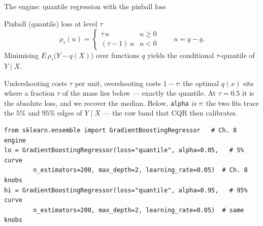 \documentclass[aspectratio=169,11pt]{beamer}
\begin{document}
\begin{frame}[fragile]{The engine: quantile regression with the pinball loss}
  \footnotesize
  \begin{block}{Pinball (quantile) loss at level $\tau$}
    \[
      \rho_\tau(u) =
      \begin{cases}
        \tau\, u & u \ge 0 \\
        (\tau - 1)\, u & u < 0
      \end{cases}
      \qquad u = y - q .
    \]
    Minimising $E\,\rho_\tau\big(Y - q(X)\big)$ over functions $q$ yields the
    conditional $\tau$-quantile of $Y \mid X$.
  \end{block}
  \begin{readme}
    Undershooting costs $\tau$ per unit, overshooting costs $1 - \tau$: the optimal
    $q(x)$ sits where a fraction $\tau$ of the mass lies below --- exactly the
    quantile. At $\tau = 0.5$ it is the absolute loss, and we recover the median.
    Below, \texttt{alpha} \emph{is} $\tau$: the two fits trace the $5\%$ and
    $95\%$ edges of $Y \mid X$ --- the raw band that CQR then calibrates.
  \end{readme}
  \begin{lstlisting}
from sklearn.ensemble import GradientBoostingRegressor   # Ch. 8 engine
lo = GradientBoostingRegressor(loss="quantile", alpha=0.05,   # 5% curve
        n_estimators=200, max_depth=2, learning_rate=0.05)  # Ch. 8 knobs
hi = GradientBoostingRegressor(loss="quantile", alpha=0.95,   # 95% curve
        n_estimators=200, max_depth=2, learning_rate=0.05)  # same knobs
  \end{lstlisting}
\end{frame}
\end{document}
